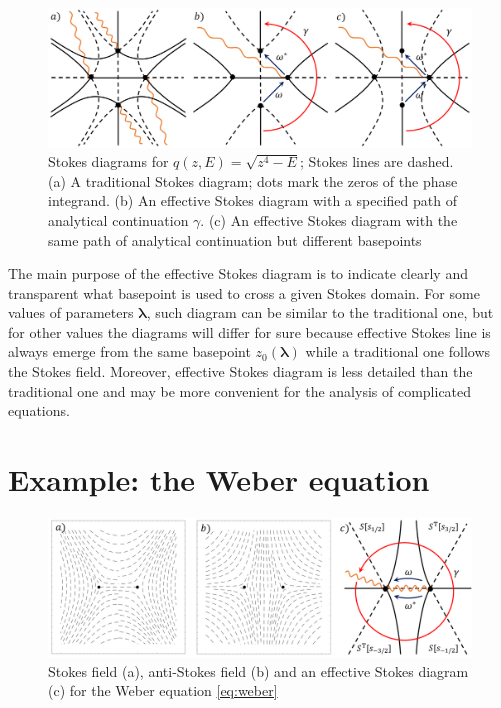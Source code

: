 \documentclass[atmp]{ipart_v1}
\def\lmbd{\bm{\lambda}}
\newcommand\eref[1]{\eqref{#1}}
\begin{document}
\begin{figure}
\centering
\noindent
\includegraphics[width=\textwidth]{effsd_2.png}
\caption{
Stokes diagrams for $q(z,E)=\sqrt{z^4-E}$; Stokes lines are dashed.
(a) A traditional Stokes diagram; dots mark the zeros of the phase integrand.
(b) An effective Stokes diagram with a specified path of analytical continuation $\gamma$.
(c) An effective Stokes diagram with the same path of analytical continuation but different basepoints}
\label{fig:effsd_2}
\end{figure} 

The main purpose of the effective Stokes diagram is to indicate clearly and transparent what
basepoint is used to cross a given Stokes domain. For some values of parameters $\lmbd$, such
diagram can be similar to the traditional one, but for other values the diagrams will differ
for sure because effective Stokes line is always emerge from the same basepoint $z_0(\lmbd)$
while a traditional one follows the Stokes field. Moreover, effective Stokes diagram
is less detailed than the traditional one and may be more convenient for the analysis of 
complicated equations.














\section{Example: the Weber equation \label{sec:weber}}

\begin{figure}
\centering
\noindent
\includegraphics[width=\textwidth]{wsd.png}
\caption{Stokes field (a), anti-Stokes field (b) and an effective Stokes diagram (c) 
for the Weber equation \eref{eq:weber}}
\label{fig:wsd}
\end{figure} 
\end{document}
